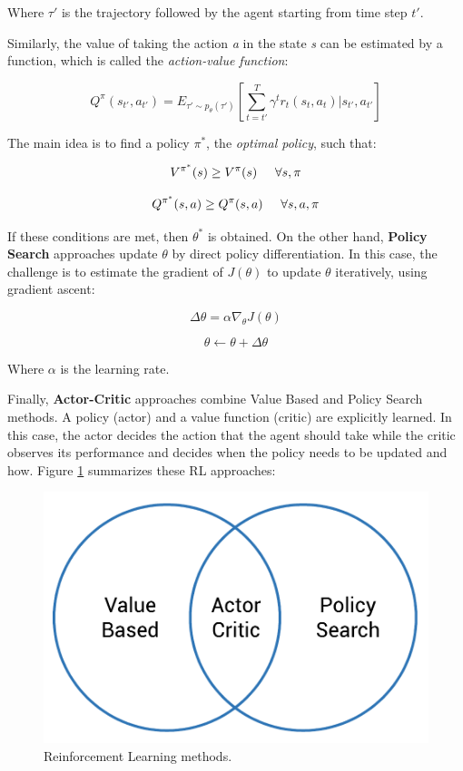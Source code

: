 Where $\tau'$ is the trajectory followed by the agent starting from time step $t'$.

Similarly, the value of taking the action \emph{a} in the state \emph{s} can be estimated by a function, which is called the \emph{action-value function}:

\begin{equation}
    Q^{\pi}(s_{t'}, a_{t'})  = E_{\tau' \sim p_{\theta}(\tau')}\left[\sum_{t=t'}^{T}\gamma^{t}r_{t}(s_{t}, a_{t})|s_{t'},a_{t'}\right]
\end{equation}

The main idea is to find a policy $\pi^{*}$, the \emph{optimal policy}, such that:

\begin{equation}
    V^{\pi^{*}}(s) \geq V^{\pi}(s) \hspace{0.5cm} \forall s, \pi
\end{equation}

\begin{equation}
    Q^{\pi^{*}}(s,a) \geq Q^{\pi}(s,a) \hspace{0.5cm} \forall s,a,\pi
\end{equation}

If these conditions are met, then $\theta^{*}$ is obtained. On the other hand, \textbf{Policy Search} approaches update $\theta$ by direct policy differentiation. In this case, the challenge is to estimate the gradient of $J(\theta)$ to update $\theta$ iteratively, using gradient ascent:

\begin{equation}
    \Delta \theta = \alpha \nabla_{\theta}J(\theta)
\end{equation}

\begin{equation}
    \theta \leftarrow \theta + \Delta \theta
\end{equation}

Where $\alpha$ is the learning rate.

Finally, \textbf{Actor-Critic} approaches combine Value Based and Policy Search methods. A policy (actor) and a value function (critic) are explicitly learned. In this case, the actor decides the action that the agent should take while the critic observes its performance and decides when the policy needs to be updated and how. Figure \ref{fig:rl_summ} summarizes these RL approaches:

\begin{figure}[h]
    \centering
    \includegraphics[width=0.5\linewidth]{imagenes/cap1/rl_summary.pdf}
    \caption{Reinforcement Learning methods.}
    \label{fig:rl_summ}
\end{figure}

